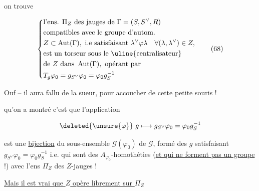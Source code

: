  on trouve

\[
\left\{\begin{aligned}
&\text{l'ens. }\Pi_Z\ \text{des jauges de }\Gamma=(S,S^\vee,R)\\
&\text{compatibles avec le groupe d'autom.}\\
&Z\subset\operatorname{Aut}(\Gamma),\ \text{i.e satisfaisant }\lambda^\vee\varphi\lambda\quad\forall(\lambda,\lambda^\vee)\in Z,\\
&\text{est un torseur sous le \uline{centralisateur}}\\
&\text{de }Z\ \text{dans }\operatorname{Aut}(\Gamma),\ \text{opérant par}\\
&T_g\varphi_0=g_{S^\vee}\varphi_0=\varphi_0g_S^{-1}
\end{aligned}\right. \tag*{(68)}
\]



Ouf -- il aura fallu de la sueur, pour accoucher de cette petite souris !

 qu'on a montré c'est que l'application

\[
\deleted{\unsure{\varphi}}\ g\longmapsto g_{S^\vee}\varphi_0=\varphi_0g_S^{-1}
\]

est une \uline{bijection} du  sous-ensemble $\mathcal G(\varphi_0)$ de $\mathcal G$, formé des $g$ satisfaisant $g_{S^\vee}\varphi_0=\varphi_0g_S^{-1}$ i.e. qui sont des $A_{\varphi_0}$-homothéties (\uline{et qui ne forment pas  un groupe} !) avec l'ens $\Pi_Z$ des $Z$-jauges !



\uline{Mais il est vrai que $Z$ opère librement sur $\Pi_Z$}
